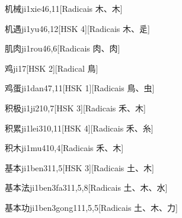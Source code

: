 \begin{entry}{机械}{ji1xie4}{6,11}[Radicais ⽊、⽊]
\end{entry}

\begin{entry}{机遇}{ji1yu4}{6,12}[HSK 4][Radicais ⽊、⾡]
\end{entry}

\begin{entry}{肌肉}{ji1rou4}{6,6}[Radicais ⾁、⾁]
\end{entry}

\begin{entry}{鸡}{ji1}{7}[HSK 2][Radical ⿃]
\end{entry}

\begin{entry}{鸡蛋}{ji1dan4}{7,11}[HSK 1][Radicais ⿃、⾍]
\end{entry}

\begin{entry}{积极}{ji1ji2}{10,7}[HSK 3][Radicais ⽲、⽊]
\end{entry}

\begin{entry}{积累}{ji1lei3}{10,11}[HSK 4][Radicais ⽲、⽷]
\end{entry}

\begin{entry}{积木}{ji1mu4}{10,4}[Radicais ⽲、⽊]
\end{entry}

\begin{entry}{基本}{ji1ben3}{11,5}[HSK 3][Radicais ⼟、⽊]
\end{entry}

\begin{entry}{基本法}{ji1ben3fa3}{11,5,8}[Radicais ⼟、⽊、⽔]
\end{entry}

\begin{entry}{基本功}{ji1ben3gong1}{11,5,5}[Radicais ⼟、⽊、⼒]
\end{entry}

